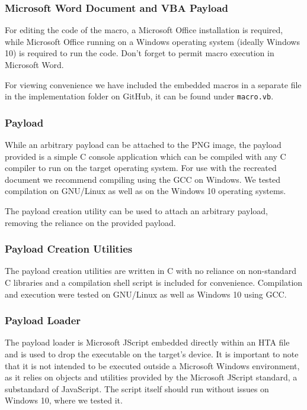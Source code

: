\subsubsection{Microsoft Word Document and VBA Payload}
For editing the code of the macro, a Microsoft Office installation is required, while Microsoft Office running 
on a Windows operating system (ideally Windows 10) is required to run the code. Don't forget to permit macro 
execution in Microsoft Word. 

For viewing convenience we have included the embedded macros in a separate file in the implementation folder on
GitHub, it can be found under \verb+macro.vb+.

\subsubsection{Payload}
While an arbitrary payload can be attached to the \acrshort{PNG} image, the payload provided is a simple C console
application which can be compiled with any C compiler to run on the target operating system. For use with the 
recreated document we recommend compiling using the \acrfull{GCC} on Windows. We tested compilation on GNU/Linux
as well as on the Windows 10 operating systems.

The payload creation utility can be used to attach an arbitrary payload, removing the reliance on the provided 
payload.

\subsubsection{Payload Creation Utilities}
The payload creation utilities are written in C with no reliance on non-standard C libraries and a compilation
shell script is included for convenience. Compilation and execution were tested on GNU/Linux as well as Windows 10
using \acrshort{GCC}.

\subsubsection{Payload Loader}
The payload loader is Microsoft JScript embedded directly within an \acrfull{HTA} file and is used to drop the
executable on the target's device. It is important to note that it is not intended to be executed outside a 
Microsoft Windows environment, as it relies on objects and utilities provided by the Microsoft JScript standard,
a substandard of JavaScript. The script itself should run without issues on Windows 10, where we tested it.

